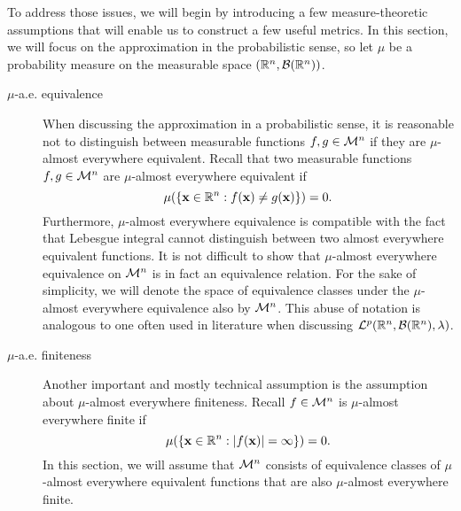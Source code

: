 To address those issues, we will begin by introducing a few measure-theoretic assumptions that will enable us to construct a few useful metrics. In this section, we will focus on the approximation in the probabilistic sense, so let $\mu$ be a probability measure on the measurable space $({\mathbb R}^n, {\mathcal B}({\mathbb R}^n))$.
\begin{description}
\item[$\mu$-a.e. equivalence] When discussing the approximation in a probabilistic sense, it is reasonable not to distinguish between measurable functions $f, g \in {\mathcal M}^n$ if they are $\mu$-almost everywhere equivalent. Recall that two measurable functions $f, g \in {\mathcal M}^n$ are $\mu$-almost everywhere equivalent if \[ 
    \mu (\{ \mathbf{x} \in {\mathbb R}^n : f (\mathbf{x}) \neq g(\mathbf{x})  \}) = 0.
\]
\newpage
Furthermore, $\mu$-almost everywhere equivalence is compatible with the fact that Lebesgue integral cannot distinguish between two almost everywhere equivalent functions. It is not difficult to show that $\mu$-almost everywhere equivalence on ${\mathcal M}^n$ is in fact an equivalence relation. For the sake of simplicity, we will denote the space of equivalence classes under the $\mu$-almost everywhere equivalence also by ${\mathcal M}^n$. This abuse of notation is analogous to one often used in literature when discussing ${\mathcal {L}^p}({\mathbb R}^n, {\mathcal B}({\mathbb R}^n), \lambda)$.
\item[$\mu$-a.e. finiteness] Another important and mostly technical assumption is the assumption about $\mu$-almost everywhere finiteness. Recall $f \in {\mathcal M}^n$ is $\mu$-almost everywhere finite if \[
    \mu (\{ \mathbf{x} \in {\mathbb R}^n : | f(\mathbf{x}) | = \infty \}) = 0.
\]
In this section, we will assume that ${\mathcal M}^n$ consists of equivalence classes of $\mu$-almost everywhere equivalent functions that are also $\mu$-almost everywhere finite.
\end{description}

